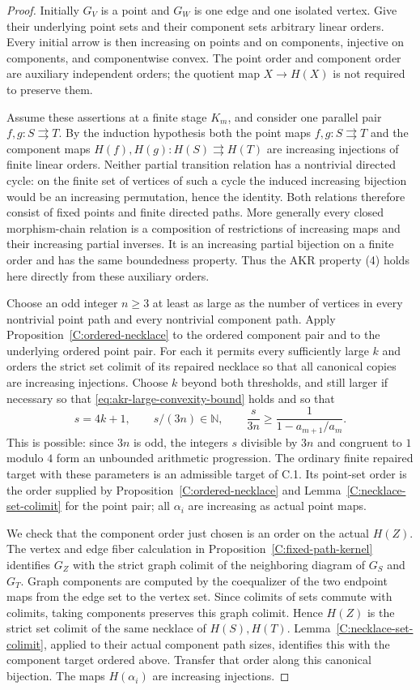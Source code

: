 \begin{proof}
Initially $G_V$ is a point and $G_W$ is one edge and one isolated
vertex. Give their underlying point sets and their component sets
arbitrary linear orders. Every initial arrow is then increasing
on points and on components, injective on components, and
componentwise convex. The point order and component order are
auxiliary independent orders; the quotient map $X\to H(X)$ is not
required to preserve them.

Assume these assertions at a finite stage $K_m$, and consider one
parallel pair $f,g:S\rightrightarrows T$. By the induction hypothesis
both the point maps $f,g:S\rightrightarrows T$ and the component maps
$H(f),H(g):H(S)\rightrightarrows H(T)$ are increasing injections of
finite linear orders. Neither partial transition relation has a
nontrivial directed cycle: on the finite set of vertices of such a
cycle the induced increasing bijection would be an increasing
permutation, hence the identity. Both relations therefore consist
of fixed points and finite directed paths. More generally every
closed morphism-chain relation is a composition of restrictions
of increasing maps and their increasing partial inverses. It is
an increasing partial bijection on a finite order and has the
same boundedness property. Thus the AKR property (4) holds here
directly from these auxiliary orders.

Choose an odd integer $n\geq3$ at least as large as the number of
vertices in every nontrivial point path and every nontrivial
component path. Apply Proposition~\ref{C:ordered-necklace} to the ordered
component pair and to the underlying ordered point pair. For each
it permits every sufficiently large $k$ and orders the strict set
colimit of its repaired necklace so that all canonical copies are
increasing injections. Choose $k$ beyond both thresholds, and still
larger if necessary so that
\eqref{eq:akr-large-convexity-bound} holds and so that
\[
 s=4k+1,\qquad s/(3n)\in\mathbb N,\qquad
 \frac{s}{3n}\geq\frac{1}{1-a_{m+1}/a_m}.
\]
This is possible: since $3n$ is odd, the integers $s$ divisible by
$3n$ and congruent to $1$ modulo $4$ form an unbounded arithmetic
progression. The ordinary finite repaired target with these
parameters is an admissible target of C.1. Its point-set order is
the order supplied by Proposition~\ref{C:ordered-necklace} and
Lemma~\ref{C:necklace-set-colimit} for the point pair; all $\alpha_i$ are
increasing as actual point maps.

We check that the component order just chosen is an order on the
actual $H(Z)$. The vertex and edge fiber calculation in
Proposition~\ref{C:fixed-path-kernel} identifies $G_Z$ with the
strict graph colimit of the neighboring diagram of $G_S$ and
$G_T$. Graph components are computed by the coequalizer of the two
endpoint maps from the edge set to the vertex set. Since colimits
of sets commute with colimits, taking components preserves this
graph colimit. Hence $H(Z)$ is the strict set colimit of the same necklace
of $H(S),H(T)$. Lemma~\ref{C:necklace-set-colimit}, applied to their
actual component path sizes, identifies this with the component
target ordered above. Transfer that order along this canonical
bijection. The maps $H(\alpha_i)$ are increasing injections.


\end{proof}
